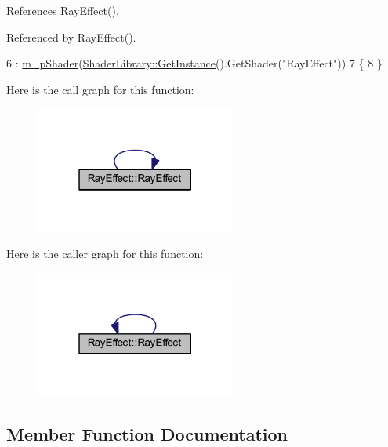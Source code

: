 References Ray\+Effect().



Referenced by Ray\+Effect().


\begin{DoxyCode}
6   : \hyperlink{class_ray_effect_a8633b843d8f014110b994465eb8a2590}{m\_pShader}(\hyperlink{class_singleton_a74f32751d99bf3cc95fe17aba11f4b07}{ShaderLibrary::GetInstance}().GetShader(\textcolor{stringliteral}{"RayEffect"}))
7 \{
8 \}
\end{DoxyCode}


Here is the call graph for this function\+:\nopagebreak
\begin{figure}[H]
\begin{center}
\leavevmode
\includegraphics[width=187pt]{class_ray_effect_a4be88c0ce86e43a8229dfa9696795ae7_cgraph}
\end{center}
\end{figure}




Here is the caller graph for this function\+:\nopagebreak
\begin{figure}[H]
\begin{center}
\leavevmode
\includegraphics[width=187pt]{class_ray_effect_a4be88c0ce86e43a8229dfa9696795ae7_icgraph}
\end{center}
\end{figure}




\subsection{Member Function Documentation}
